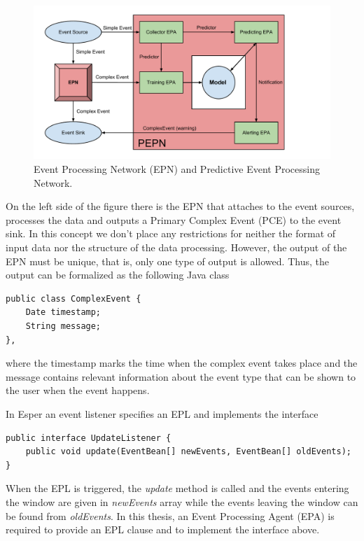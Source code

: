 \begin{figure}
\centering
\includegraphics[scale=0.7]{images/epn.pdf}
\caption{Event Processing Network (EPN) and Predictive Event Processing Network.}
\label{fig:pepn}
\end{figure}


On the left side of the figure there is the EPN that attaches to the event sources, processes the data and outputs a Primary Complex Event (PCE) to the event sink. In this concept we don't place any restrictions for neither the format of input data nor the structure of the data processing. However, the output of the EPN must be unique, that is, only one type of output is allowed. Thus, the output can be formalized as the following Java class
\begin{Verbatim}[xleftmargin=1.5em]
public class ComplexEvent {
	Date timestamp;
	String message;
},
\end{Verbatim}
where the timestamp marks the time when the complex event takes place and the message contains relevant information about the event type that can be shown to the user when the event happens. 

In Esper an event listener specifies an EPL and implements the interface
\begin{Verbatim}[xleftmargin=1.5em]
public interface UpdateListener {
	public void update(EventBean[] newEvents, EventBean[] oldEvents);
}
\end{Verbatim}

When the EPL is triggered, the \emph{update} method is called and the events entering the window are given in \emph{newEvents} array while the events leaving the window can be found from \emph{oldEvents}. \cite{EsperReference} In this thesis, an Event Processing Agent (EPA) is required to provide an EPL clause and to implement the interface above.


